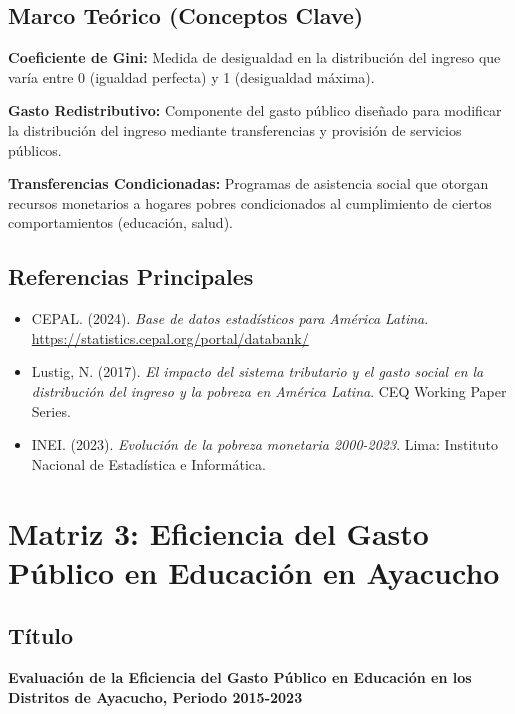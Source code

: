 \documentclass[
  man,
  floatsintext,
  longtable,
  a4paper,
  nolmodern,
  notxfonts,
  notimes,
  12pt,
  colorlinks=true,linkcolor=blue,citecolor=blue,urlcolor=blue]{apa7}
\providecommand{\tightlist}{%
  \setlength{\itemsep}{0pt}\setlength{\parskip}{0pt}}
\begin{document}
\subsection{Marco Teórico (Conceptos
Clave)}\label{marco-teuxf3rico-conceptos-clave-1}

\textbf{Coeficiente de Gini:} Medida de desigualdad en la distribución
del ingreso que varía entre 0 (igualdad perfecta) y 1 (desigualdad
máxima).

\textbf{Gasto Redistributivo:} Componente del gasto público diseñado
para modificar la distribución del ingreso mediante transferencias y
provisión de servicios públicos.

\textbf{Transferencias Condicionadas:} Programas de asistencia social
que otorgan recursos monetarios a hogares pobres condicionados al
cumplimiento de ciertos comportamientos (educación, salud).

\subsection{Referencias Principales}\label{referencias-principales-1}

\begin{itemize}
\tightlist
\item
  CEPAL. (2024). \emph{Base de datos estadísticos para América Latina}.
  \url{https://statistics.cepal.org/portal/databank/}
\item
  Lustig, N. (2017). \emph{El impacto del sistema tributario y el gasto
  social en la distribución del ingreso y la pobreza en América Latina}.
  CEQ Working Paper Series.
\item
  INEI. (2023). \emph{Evolución de la pobreza monetaria 2000-2023}.
  Lima: Instituto Nacional de Estadística e Informática.
\end{itemize}

\section{Matriz 3: Eficiencia del Gasto Público en Educación en
Ayacucho}\label{matriz-3-eficiencia-del-gasto-puxfablico-en-educaciuxf3n-en-ayacucho}

\subsection{Título}\label{tuxedtulo-2}

\textbf{Evaluación de la Eficiencia del Gasto Público en Educación en
los Distritos de Ayacucho, Periodo 2015-2023}
\end{document}
